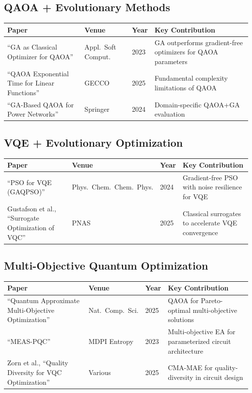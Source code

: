 \documentclass[11pt]{article}
\begin{document}
\subsection{QAOA + Evolutionary Methods}

\begin{longtable}{p{5.5cm} p{3cm} p{1cm} p{4.5cm}}
\toprule
\textbf{Paper} & \textbf{Venue} & \textbf{Year} & \textbf{Key Contribution} \\
\midrule
\endhead
``GA as Classical Optimizer for QAOA'' \cite{gaqaoa2023} & Appl.\ Soft Comput. & 2023 & GA outperforms gradient-free optimizers for QAOA parameters \\
\addlinespace
``QAOA Exponential Time for Linear Functions'' \cite{qaoaexp2025} & GECCO & 2025 & Fundamental complexity limitations of QAOA \\
\addlinespace
``GA-Based QAOA for Power Networks'' \cite{gaqaoapower2024} & Springer & 2024 & Domain-specific QAOA+GA evaluation \\
\bottomrule
\end{longtable}

\subsection{VQE + Evolutionary Optimization}

\begin{longtable}{p{5.5cm} p{3cm} p{1cm} p{4.5cm}}
\toprule
\textbf{Paper} & \textbf{Venue} & \textbf{Year} & \textbf{Key Contribution} \\
\midrule
\endhead
``PSO for VQE (GAQPSO)'' \cite{gaqpso2024} & Phys.\ Chem.\ Chem.\ Phys. & 2024 & Gradient-free PSO with noise resilience for VQE \\
\addlinespace
Gustafson et al., ``Surrogate Optimization of VQC'' \cite{gustafson2025} & PNAS & 2025 & Classical surrogates to accelerate VQE convergence \\
\bottomrule
\end{longtable}

\subsection{Multi-Objective Quantum Optimization}

\begin{longtable}{p{5.5cm} p{3cm} p{1cm} p{4.5cm}}
\toprule
\textbf{Paper} & \textbf{Venue} & \textbf{Year} & \textbf{Key Contribution} \\
\midrule
\endhead
``Quantum Approximate Multi-Objective Optimization'' \cite{qamoo2025} & Nat.\ Comp.\ Sci. & 2025 & QAOA for Pareto-optimal multi-objective solutions \\
\addlinespace
``MEAS-PQC'' \cite{measpqc2023} & MDPI Entropy & 2023 & Multi-objective EA for parameterized circuit architecture \\
\addlinespace
Zorn et al., ``Quality Diversity for VQC Optimization'' \cite{zorn2025} & Various & 2025 & CMA-MAE for quality-diversity in circuit design \\
\bottomrule
\end{longtable}
\end{document}
